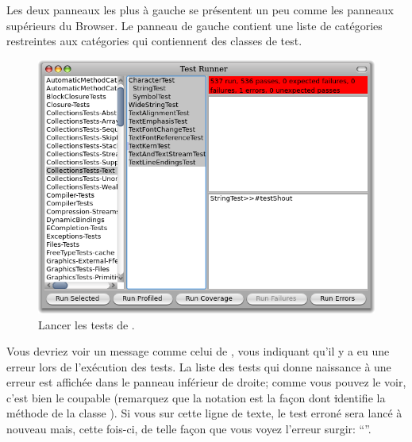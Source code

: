 \documentclass[a4paper,10pt,twoside]{book}
\begin{document}

 Les deux panneaux les plus à gauche se présentent un peu comme les
 panneaux supérieurs du Browser. Le panneau de gauche contient
 une liste de catégories restreintes aux catégories qui
 contiennent des classes de test.


\begin{figure}[hbt]
\centerline {\includegraphics[width=\textwidth]{testRunnerOnStringTest}}
\caption{Lancer les tests de .
}
\end{figure}

Vous devriez voir un message comme celui de
, vous indiquant qu'il y a eu une erreur
lors de l'exécution des tests. La liste des tests qui donne
naissance à une erreur est affichée dans le panneau inférieur de
droite; comme vous pouvez le voir, c'est bien
 le coupable
(remarquez que la notation  est la façon dont \st
identifie la méthode de la classe ).
Si vous \clickz{} sur cette ligne de texte, le test erroné sera
lancé à nouveau mais, cette fois-ci, de telle façon que vous
voyez l'erreur surgir:
``''.
\end{document}
